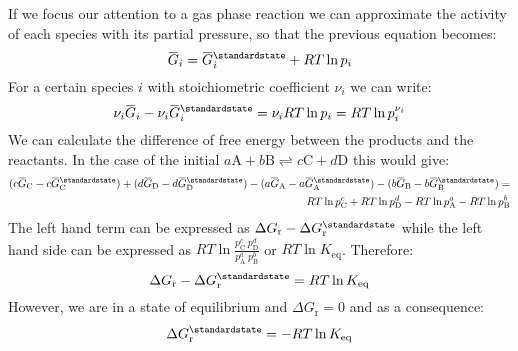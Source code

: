 \documentclass[12pt,a4paper]{report}
\newcommand{\overbar}[1]{\mkern 1.5mu\overline{\mkern-1.5mu#1\mkern-1.5mu}\mkern 1.5mu}
\begin{document}
   If we focus our attention to a gas phase reaction we can approximate the activity of each species with its partial pressure, so that the previous equation becomes:
   \begin{equation*}
   \overbar{G}_{i}=\overbar{G}_{i}^{\standardstate}+RT \ln p_{i}
   \end{equation*}
   For a certain species $i$ with stoichiometric coefficient $\nu_{i}$ we can write:
   \begin{equation*}
   \nu_{i}\overbar{G}_{i}-\nu_{i}\overbar{G}_{i}^{\standardstate}=\nu_{i}RT \ln p_{i} = RT \ln p_{i}^{\nu_{i}} 
   \end{equation*}
   We can calculate the difference of free energy between the products and the reactants. In the case of the initial $a\mathrm{A}+b\mathrm{B} \rightleftharpoons c\mathrm{C}+d\mathrm{D}$ this would give:
   \begin{align*}
   (c\overbar{G}_{\mathrm{C}}-c\overbar{G}^{\standardstate}_{\mathrm{C}})+(d\overbar{G}_{\mathrm{D}}-d\overbar{G}^{\standardstate}_{\mathrm{D}})-(a\overbar{G}_{\mathrm{A}}-a\overbar{G}^{\standardstate}_{\mathrm{A}})-(b\overbar{G}_{\mathrm{B}}-b\overbar{G}^{\standardstate}_{\mathrm{B}}) =\\ RT\ln p_{\mathrm{C}}^{c}+RT\ln p_{\mathrm{D}}^{d}-RT\ln p_{\mathrm{A}}^{a}-RT\ln p_{\mathrm{B}}^{b}
   \end{align*}
   The left hand term can be expressed as $\Delta G_{\mathrm{r}}-\Delta G^{\standardstate}_{\mathrm{r}}$ while the left hand side can be expressed as $RT\ln \frac{p_{\mathrm{C}}^{c}\ p_{\mathrm{D}}^{d}}{p_{\mathrm{A}}^{a}\  p_{\mathrm{B}}^{b}}$ or $RT \ln K_{\mathrm{eq}}$.
   Therefore:
   \begin{equation*}
   \Delta G_{\mathrm{r}}-\Delta G^{\standardstate}_{\mathrm{r}}=RT \ln K_{\mathrm{eq}}
   \end{equation*}
   However, we are in a state of equilibrium and $\Delta G_{\mathrm{r}} = 0$ and as a consequence:
   \begin{equation*}
   \Delta G^{\standardstate}_{\mathrm{r}}=-RT \ln K_{\mathrm{eq}}
   \end{equation*}
\end{document}
